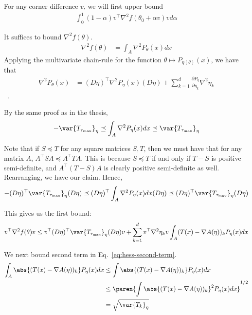 \documentclass[10pt, a4paper]{article}
\begin{document}
For any corner difference $v$,
we will first upper bound
\begin{align*}
    \int_0^1 (1-\alpha) v^\top \nabla^2 f(\theta_0 + \alpha v) v d\alpha
\end{align*}

It suffices to bound $\nabla^2 f(\theta)$.
\begin{align*}
    \nabla^2 f(\theta)
    &=
    \int_A \nabla^2 P_\theta(x) dx
\end{align*}
Applying the multivariate chain-rule for the function
$\theta \mapsto P_{\eta(\theta)}(x)$,
we have that
\begin{align*}
    \nabla^2 P_\theta(x)
    &=
    (D\eta)^\top \nabla^2 P_\eta(x) (D\eta)
    + 
    \sum\limits_{k=1}^d 
    \frac{\partial P_\eta}{\partial \eta_k}
    \nabla^2 \eta_k
\end{align*}
~\cite{skorski:2019:hess}.

By the same proof as in the thesis,
\begin{align*}
    -\var{T_{\tau_{\max}}}_{\eta}
    \preceq
    \int_A \nabla^2 P_{\eta}(x) dx
    \preceq
    \var{T_{\tau_{\max}}}_{\eta}
\end{align*}

Note that if $S \preceq T$
for any square matrices $S, T$,
then we must have that for any matrix $A$,
$A^\top S A \preceq A^\top T A$.
This is because $S \preceq T$
if and only if $T - S$ is positive semi-definite,
and $A^\top (T-S) A$ is clearly positive semi-definite as well.
Rearranging, we have our claim.
Hence, 
\begin{align*}
    -(D\eta)^\top
    \var{T_{\tau_{\max}}}_{\eta}
    (D\eta)
    \preceq
    (D\eta)^\top
    \int_A \nabla^2 P_{\eta}(x) dx
    (D\eta)
    \preceq
    (D\eta)^\top
    \var{T_{\tau_{\max}}}_{\eta}
    (D\eta)
\end{align*}

This gives us the first bound:
\begin{align}
    v^\top \nabla^2 f(\theta) v
    \leq
    v^\top (D\eta)^\top \var{T_{\tau_{\max}}}_{\eta} (D\eta) v
    +
    \sum\limits_{k=1}^d 
    v^\top \nabla^2 \eta_k v
    \int_A (T(x) - \nabla A(\eta))_k P_\eta(x) dx
    \label{eq:hess-second-term}
\end{align}

We next bound second term in Eq.~\ref{eq:hess-second-term}.
\begin{align*}
    \int_A \abs{(T(x) - \nabla A(\eta))_k} P_\eta(x) dx
    &\leq
    \int \abs{(T(x) - \nabla A(\eta))_k} P_\eta(x) dx
    \\&\leq
    \paren{\int \abs{(T(x) - \nabla A(\eta))_k}^2 P_\eta(x) dx}^{1/2}
    \\&=
    \sqrt{\var{T_k}_\eta}
\end{align*}
\end{document}
